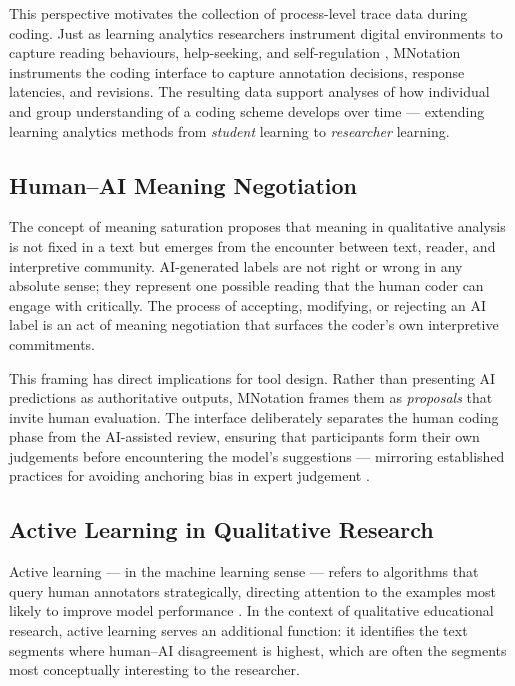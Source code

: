 \documentclass[fleqn,10pt]{JLA_article}
\begin{document}
This perspective motivates the collection of process-level trace data during coding.
Just as learning analytics researchers instrument digital environments to capture
reading behaviours, help-seeking, and self-regulation \cite{flora2025}, MNotation
instruments the coding interface to capture annotation decisions, response latencies,
and revisions. The resulting data support analyses of how individual and group
understanding of a coding scheme develops over time — extending learning analytics
methods from \emph{student} learning to \emph{researcher} learning.

\subsection{Human--AI Meaning Negotiation}

The concept of meaning saturation \cite{liu2026meaning} proposes that meaning in
qualitative analysis is not fixed in a text but emerges from the encounter between
text, reader, and interpretive community. AI-generated labels are not right or wrong
in any absolute sense; they represent one possible reading that the human coder can
engage with critically. The process of accepting, modifying, or rejecting an AI label
is an act of meaning negotiation that surfaces the coder's own interpretive commitments.

This framing has direct implications for tool design. Rather than presenting AI
predictions as authoritative outputs, MNotation frames them as \emph{proposals} that
invite human evaluation. The interface deliberately separates the human coding phase
from the AI-assisted review, ensuring that participants form their own judgements before
encountering the model's suggestions — mirroring established practices for avoiding
anchoring bias in expert judgement \cite{nickerson1998confirmation}.

\subsection{Active Learning in Qualitative Research}

Active learning — in the machine learning sense — refers to algorithms that query human
annotators strategically, directing attention to the examples most likely to improve
model performance \cite{settles2012active}. In the context of qualitative educational
research, active learning serves an additional function: it identifies the text segments
where human--AI disagreement is highest, which are often the segments most conceptually
interesting to the researcher.
\end{document}
